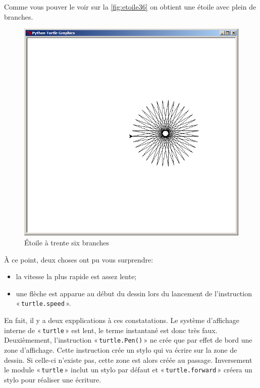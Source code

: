 Comme vous pouver le voir sur la \autoref{fig:etoile36} on obtient une étoile avec plein de branches.
\begin{figure}[h!]
\centering
\includegraphics[scale=0.4]{images/etoile36}
\caption{Étoile à trente six branches}\label{fig:etoile36}
\end{figure}

À ce point, deux choses ont pu vous surprendre:
\begin{itemize}
\item la vitesse la plus rapide est assez lente;
\item une flèche est apparue au début du dessin lors du lancement de l'instruction\\
« \texttt{turtle.speed} ». 
\end{itemize}

En fait, il y a deux expplications à ces constatations. Le système d'affichage interne de « \texttt{turtle} » est lent, le terme instantané est donc très faux. Deuxièmement, l'instruction « \texttt{turtle.Pen()} » ne crée que par effet de bord une zone d'affichage. Cette instruction crée un stylo qui va écrire sur la zone de dessin. Si celle-ci n'existe pas, cette zone est alors créée au passage. Inversement le module « \texttt{turtle} » inclut un stylo par défaut et « \texttt{turtle.forward} » créera un stylo pour réaliser une écriture.

